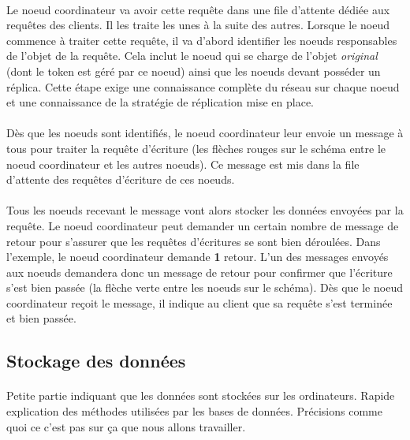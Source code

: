 \documentclass[12pt]{article}
\begin{document}
\paragraph{} Le noeud coordinateur va avoir cette requête dans une file d'attente dédiée aux requêtes des clients. Il les traite les unes à la suite des autres. Lorsque le noeud commence à traiter cette requête, il va d'abord identifier les noeuds responsables de l'objet de la requête. Cela inclut le noeud qui se charge de l'objet \textit{original} (dont le token est géré par ce noeud) ainsi que les noeuds devant posséder un réplica. Cette étape exige une connaissance complète du réseau sur chaque noeud et une connaissance de la stratégie de réplication mise en place.

\paragraph{} Dès que les noeuds sont identifiés, le noeud coordinateur leur envoie un message à tous pour traiter la requête d'écriture (les flèches rouges sur le schéma entre le noeud coordinateur et les autres noeuds). Ce message est mis dans la file d'attente des requêtes d'écriture de ces noeuds.

\paragraph{} Tous les noeuds recevant le message vont alors stocker les données envoyées par la requête. Le noeud coordinateur peut demander un certain nombre de message de retour pour s'assurer que les requêtes d'écritures se sont bien déroulées. Dans l'exemple, le noeud coordinateur demande \textbf{1} retour. L'un des messages envoyés aux noeuds demandera donc un message de retour pour confirmer que l'écriture s'est bien passée (la flèche verte entre les noeuds sur le schéma). Dès que le noeud coordinateur reçoit le message, il indique au client que sa requête s'est terminée et bien passée.

\subsection{Stockage des données}
\paragraph{} Petite partie indiquant que les données sont stockées sur les ordinateurs. Rapide explication des méthodes utilisées par les bases de données. Précisions comme quoi ce c'est pas sur ça que nous allons travailler.
\end{document}
